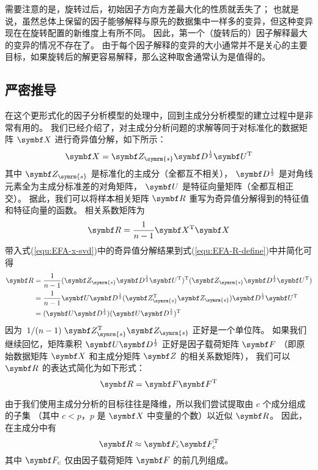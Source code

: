 需要注意的是，旋转过后，初始因子方向方差最大化的性质就丢失了；
也就是说，虽然总体上保留的因子能够解释与原先的数据集中一样多的变异，但这种变异现在在旋转配置的新维度上有所不同。
因此，第一个（旋转后的）因子解释最大的变异的情况不存在了。
由于每个因子解释的变异的大小通常并不是关心的主要目标，如果旋转后的解更容易解释，那么这种取舍通常认为是值得的。

\subsection{严密推导}\label{sec:EFA-Mechanics}

在这个更形式化的因子分析模型的处理中，回到主成分分析模型的建立过程中是非常有用的。
我们已经介绍了，对主成分分析问题的求解等同于对标准化的数据矩阵 $ \vX $ 进行奇异值分解，如下所示：
\begin{equation}\label{equ:EFA-x-svd}
    \vX = \vZ_{\symrm{s}} \vD^{\frac{1}{2}}\vU\T
\end{equation}
其中 $ \vZ_{\symrm{s}} $ 是标准化的主成分（全都互不相关），
$ \vD^{\frac{1}{2}} $ 是对角线元素全为主成分标准差的对角矩阵，
$ \vU $ 是特征向量矩阵（全都互相正交）。
据此，我们可以将样本相关矩阵 $ \vR $ 重写为奇异值分解得到的特征值和特征向量的函数。
相关系数矩阵为
\begin{equation}\label{equ:EFA-R-define}
    \vR = \frac{1}{n-1} \vX\T \vX
\end{equation}
带入式(\ref{equ:EFA-x-svd})中的奇异值分解结果到式(\ref{equ:EFA-R-define})中并简化可得
\begin{align}
    \begin{split}
        \vR & = \frac{1}{n-1}(\vZ_{\symrm{s}} \vD^{\frac{1}{2}}\vU\T)\T(\vZ_{\symrm{s}} \vD^{\frac{1}{2}}\vU\T) \\ 
        & = \frac{1}{n-1}\vU\vD^{\frac{1}{2}}(\vZ_{\symrm{s}}\T\vZ_{\symrm{s}})\vD^{\frac{1}{2}}\vU\T \\
        & = (\vU\vD^{\frac{1}{2}})(\vU\vD^{\frac{1}{2}})\T
    \end{split}
\end{align}
因为 $ \hfrac{1}{(n-1)}\vZ_{\symrm{s}}\T\vZ_{\symrm{s}} $ 正好是一个单位阵。
如果我们继续回忆，矩阵乘积 $ \vU\vD^{\frac{1}{2}} $ 正好是因子载荷矩阵 $ \vF $
（即原始数据矩阵 $ \vX $ 和主成分矩阵 $ \vZ $ 的相关系数矩阵），
我们可以 $ \vR $ 的表达式简化为如下形式：
\begin{equation}
    \vR = \vF\vF\T
\end{equation}

由于我们使用主成分分析的目标往往是降维，所以我们尝试提取由 $ c $ 个成分组成的子集
（其中 $ c < p $，$ p $ 是 $ \vX $ 中变量的个数）以近似 $ \vR $。
因此，在主成分中有
\begin{equation}\label{equ:EFA-R-pca}
    \vR \approx \vF_c\vF_c\T
\end{equation}
其中 $ \vF_c $ 仅由因子载荷矩阵 $ \vF $ 的前几列组成。

